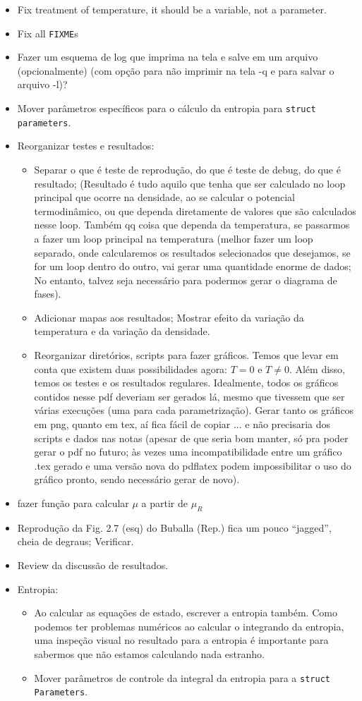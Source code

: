 \begin{itemize}
	\item Fix treatment of temperature, it should be a variable, not a parameter.
	\item Fix all \texttt{FIXME}s
	\item Fazer um esquema de log que imprima na tela e salve em um arquivo (opcionalmente) (com opção para não imprimir na tela -q e para salvar o arquivo -l)?
	\item Mover parâmetros específicos para o cálculo da entropia para \texttt{struct parameters}.
	\item Reorganizar testes e resultados:
		\begin{itemize}
			\item Separar o que é teste de reprodução, do que é teste de debug, do que é resultado; (Resultado é tudo aquilo que tenha que ser calculado no loop principal que ocorre na densidade, ao se calcular o potencial termodinâmico, ou que dependa diretamente de valores que são calculados nesse loop. Também qq coisa que dependa da temperatura, se passarmos a fazer um loop principal na temperatura (melhor fazer um loop separado, onde calcularemos os resultados selecionados que desejamos, se for um loop dentro do outro, vai gerar uma quantidade enorme de dados; No entanto, talvez seja necessário para podermos gerar o diagrama de fases).
			\item Adicionar mapas aos resultados; Mostrar efeito da variação da temperatura e da variação da densidade.
			\item Reorganizar diretórios, scripts para fazer gráficos. Temos que levar em conta que existem duas possibilidades agora: $T = 0$ e $T \neq 0$. Além disso, temos os testes e os resultados regulares. Idealmente, todos os gráficos contidos nesse pdf deveriam ser gerados lá, mesmo que tivessem que ser várias execuções (uma para cada parametrização). Gerar tanto os gráficos em png, quanto em tex, aí fica fácil de copiar ... e não precisaria dos scripts e dados nas notas (apesar de que seria bom manter, só pra poder gerar o pdf no futuro; às vezes uma incompatibilidade entre um gráfico .tex gerado e uma versão nova do pdflatex podem impossibilitar o uso do gráfico pronto, sendo necessário gerar de novo).
		\end{itemize}
	\item fazer função para calcular $\mu$ a partir de $\mu_R$
	\item Reprodução da Fig. 2.7 (esq) do Buballa (Rep.) fica um pouco ``jagged'', cheia de degraus; Verificar.
	\item Review da discussão de resultados.
	\item Entropia:
		\begin{itemize}
			\item Ao calcular as equações de estado, escrever a entropia também. Como podemos ter problemas numéricos ao calcular o integrando da entropia, uma inspeção visual no resultado para a entropia é importante para sabermos que não estamos calculando nada estranho.
			\item Mover parâmetros de controle da integral da entropia para a \texttt{struct Parameters}.
		\end{itemize}
\end{itemize}

